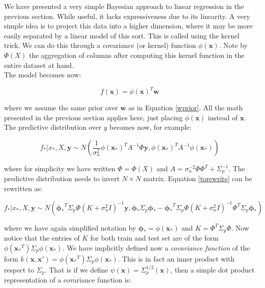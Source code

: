 \documentclass[10pt,a4paper,twoside]{book}
\begin{document}
We have presented a very simple Bayesian approach to linear regression in the previous section. While useful, it lacks expressiveness due to its linearity. A very simple idea is to project this data into a higher dimension, where it may be more easily separated by a linear model of this sort. This is called using the kernel trick. We can do this through a covariance (or kernel) function $\phi(\boldsymbol{x})$. Note by $\Phi(X)$ the aggregation of columns after computing this kernel function in the entire dataset at hand.\\

The model becomes now:

\begin{equation}
f(\boldsymbol{x}) = \phi(\boldsymbol{x})^T \boldsymbol{w}
\end{equation}

where we assume the same prior over $\boldsymbol{w}$ as in Equation \ref{wprior}. All the math presented in the previous section applies here, just placing $\phi(\boldsymbol{x})$ instead of $\boldsymbol{x}$. The predictive distribution over $y$ becomes now, for example:

\begin{equation}
\label{torewrite}
f_{*}|x_{*}, X, \boldsymbol{y} \sim N\left( \dfrac{1}{\sigma^2_n}\phi(\boldsymbol{x_*})^T A^{-1}\Phi \boldsymbol{y}, \phi(\boldsymbol{x_*})^T A^{-1}\phi(\boldsymbol{x_*})    \right)
\end{equation}

where for simplicity we have written $\Phi = \Phi(X)$ and $A = \sigma_n^{-2}\Phi\Phi^T + \Sigma_p^{-1}$. The predictive distribution needs to invert $N \times N$ matrix. Equation \ref{torewrite} can be rewritten as:

\begin{equation}
f_{*}|x_{*}, X, \boldsymbol{y} \sim N\left(\boldsymbol{\phi_*}^T\Sigma_p\Phi(K + \sigma^2_n I)^{-1}\boldsymbol{y}, \boldsymbol{\phi_*}\Sigma_p\boldsymbol{\phi_*} - \boldsymbol{\phi_*}^T\Sigma_p\Phi(K + \sigma^2_n I)^{-1}\Phi^T\Sigma_p\boldsymbol{\phi_*}\right)
\end{equation}

where we have again simplified notation by $\boldsymbol{\phi_*} = \phi(\boldsymbol{x_*})$ and $K = \Phi^T\Sigma_p\Phi$. Now notice that the entries of $K$ for both train and test set are of the form  $\phi(\boldsymbol{x_*}^T)\Sigma_p\phi(\boldsymbol{x_*})$. We have implicitly defined now a \textit{covariance function} of the form $k(\boldsymbol{x}, \boldsymbol{x'}) = \phi(\boldsymbol{x_*}^T)\Sigma_p\phi(\boldsymbol{x_*})$. This is in fact an inner product with respect to $\Sigma_p$. That is if we define $\psi(\boldsymbol{x}) = \Sigma_p^{1/2}(\boldsymbol{x})$, then a simple dot product representation of a covariance function is:
\end{document}
